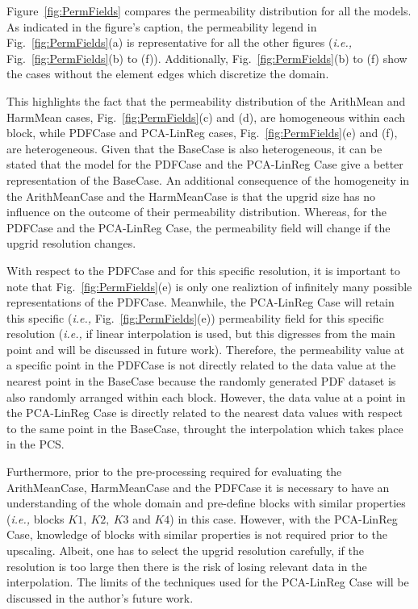 \documentclass[preprint,12pt]{elsarticle}
\newcommand{\ie}{{\it i.e., }}
\begin{document}
Figure~\ref{fig:PermFields} compares the permeability distribution for all the models. As indicated in the figure's caption, the permeability legend in Fig.~\ref{fig:PermFields}(a) is representative for all the other figures (\ie Fig.~\ref{fig:PermFields}(b) to (f)). Additionally, Fig.~\ref{fig:PermFields}(b) to (f) show the cases without the element edges which discretize the domain.

This highlights the fact that the permeability distribution of the ArithMean and HarmMean cases, Fig.~\ref{fig:PermFields}(c) and (d), are homogeneous within each block, while PDFCase and PCA-LinReg cases, Fig.~\ref{fig:PermFields}(e) and (f), are heterogeneous. Given that the BaseCase is also heterogeneous, it can be stated that the model for the PDFCase and the PCA-LinReg Case give a better representation of the BaseCase. An additional consequence of the homogeneity in the ArithMeanCase and the HarmMeanCase is that the upgrid size has no influence on the outcome of their permeability distribution. Whereas, for the PDFCase and the PCA-LinReg Case, the permeability field will change if the upgrid resolution changes.

With respect to the PDFCase and for this specific resolution, it is important to note that Fig.~\ref{fig:PermFields}(e) is only one realiztion of infinitely many possible representations of the PDFCase. Meanwhile, the PCA-LinReg Case will retain this specific (\ie Fig.~\ref{fig:PermFields}(e)) permeability field for this specific resolution (\ie if linear interpolation is used, but this digresses from the main point and will be discussed in future work). Therefore, the permeability value at a specific point in the PDFCase is not directly related to the data value at the nearest point in the BaseCase because the randomly generated PDF dataset is also randomly arranged within each block. However, the data value at a point in the PCA-LinReg Case is directly related to the nearest data values with respect to the same point in the BaseCase, throught the interpolation which takes place in the PCS.

Furthermore, prior to the pre-processing required for evaluating the ArithMeanCase, HarmMeanCase and the PDFCase it is necessary to have an understanding of the whole domain and pre-define blocks with similar properties (\ie blocks $K1,~K2,~K3$ and $K4$) in this case. However, with the PCA-LinReg Case, knowledge of blocks with similar properties is not required prior to the upscaling. Albeit, one has to select the upgrid resolution carefully, if the resolution is too large then there is the risk of losing relevant data in the interpolation. The limits of the techniques used for the PCA-LinReg Case will be discussed in the author's future work.
\end{document}
